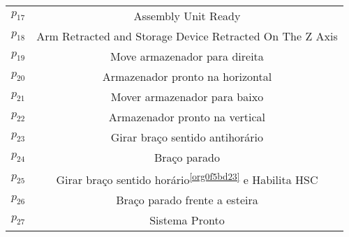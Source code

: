 \begin{table}[htbp]
\begin{tabular}{c|c}
\hyperlink{partialNet:p17}{\hypertarget{partialTable:p17}{$p_{17}$}} & Assembly Unit Ready\\
\hyperlink{partialNet:p18}{\hypertarget{partialTable:p18}{$p_{18}$}} & Arm Retracted and Storage Device Retracted On The Z Axis\\
\hyperlink{partialNet:p19}{\hypertarget{partialTable:p19}{$p_{19}$}} & Move armazenador para direita\\
\hyperlink{partialNet:p20}{\hypertarget{partialTable:p20}{$p_{20}$}} & Armazenador pronto na horizontal\\
\hyperlink{partialNet:p21}{\hypertarget{partialTable:p21}{$p_{21}$}} & Mover armazenador para baixo\\
\hyperlink{partialNet:p22}{\hypertarget{partialTable:p22}{$p_{22}$}} & Armazenador pronto na vertical\\
\hyperlink{partialNet:p23}{\hypertarget{partialTable:p23}{$p_{23}$}} & Girar braço sentido antihorário\footnotemark\\
\hyperlink{partialNet:p24}{\hypertarget{partialTable:p24}{$p_{24}$}} & Braço parado\\
\hyperlink{partialNet:p25}{\hypertarget{partialTable:p25}{$p_{25}$}} & Girar braço sentido horário\textsuperscript{\ref{org0f5bd23}} e Habilita HSC\\
\hyperlink{partialNet:p26}{\hypertarget{partialTable:p26}{$p_{26}$}} & Braço parado frente a esteira\\
\hyperlink{partialNet:p27}{\hypertarget{partialTable:p27}{$p_{27}$}} & Sistema Pronto\\
\end{tabular}
\end{table}

